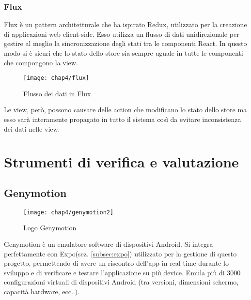 \subsubsection{Flux} \label{subsubsec:flux}
 Flux è un pattern architetturale che ha ispirato Redux, utilizzato per la 
 creazione di applicazioni web client-side. Esso utilizza un flusso di dati 
 unidirezionale per gestire al meglio la sincronizzazione degli stati tra le 
 componenti React. In questo modo si è sicuri che lo stato dello store sia 
 sempre uguale in tutte le componenti che compongono la view.
 
 \begin{figure}[H] 
 	\centering
 	\texttt{[image: chap4/flux]}
 	\caption{Flusso dei dati in Flux}
 \end{figure}
 Le view, però, possono causare delle action che modificano lo stato dello store 
 ma esso sarà interamente propagato in tutto il sistema così da evitare 
 inconsistenza dei dati nelle view.
 
 
\section{Strumenti di verifica e valutazione}

\subsection{Genymotion}
\begin{figure}[H] 
	\centering
	\texttt{[image: chap4/genymotion2]}
	\caption{Logo Genymotion}
\end{figure}
Genymotion è un emulatore software di dispositivi Android. Si integra 
perfettamente con Expo(sez. \ref{subsec:expo}) utilizzato per la gestione di 
questo progetto, permettendo di avere un riscontro dell'app in real-time durante 
lo sviluppo e di verificare e testare l'applicazione su più device. Emula più 
di 3000 configurazioni virtuali di dispositivi Android (tra versioni, dimensioni 
schermo, capacità hardware, ecc..). 

